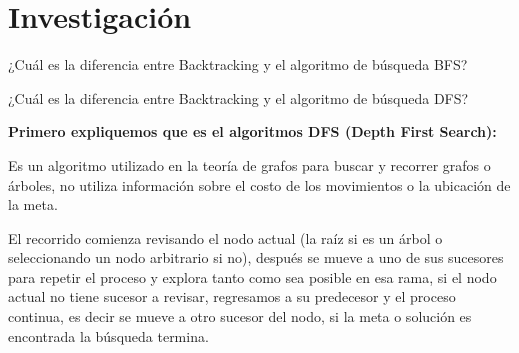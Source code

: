 \section{Investigación} 


\begin{center}
    ¿Cuál es la diferencia entre Backtracking y el algoritmo de búsqueda BFS?
\end{center}





\begin{center}
    ¿Cuál es la diferencia entre Backtracking y el algoritmo de búsqueda DFS?
\end{center}
\textbf{\large{Primero expliquemos que es el algoritmos DFS (Depth First Search):}}

Es un algoritmo utilizado en la teoría de grafos para buscar y recorrer grafos o árboles, no utiliza información sobre el costo de los movimientos o la ubicación de la meta.

El recorrido comienza revisando el nodo actual (la raíz si es un árbol o seleccionando un nodo arbitrario si no), después se mueve a uno de sus sucesores para repetir el proceso y explora tanto como sea posible en esa rama, si el nodo actual no tiene sucesor a revisar, regresamos a su predecesor y el proceso continua, es decir se mueve a otro sucesor del nodo, si la meta o solución es encontrada la búsqueda termina.

